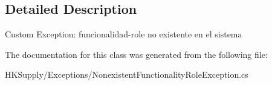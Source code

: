 \subsection{Detailed Description}
Custom Exception\+: funcionalidad-\/role no existente en el sistema 



The documentation for this class was generated from the following file\+:\begin{DoxyCompactItemize}
\item 
H\+K\+Supply/\+Exceptions/Nonexistent\+Functionality\+Role\+Exception.\+cs\end{DoxyCompactItemize}
